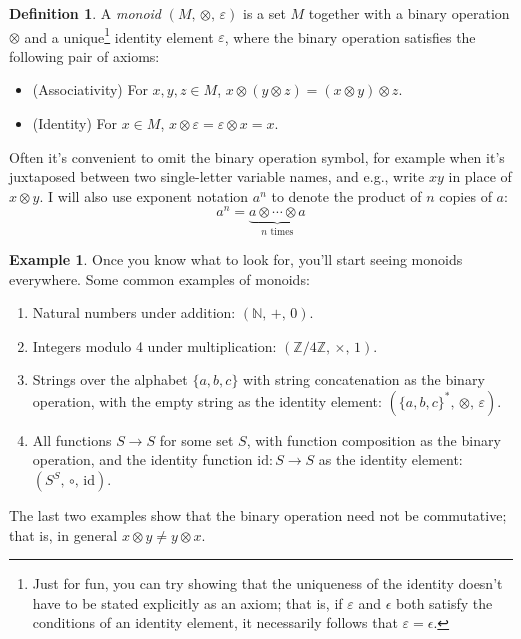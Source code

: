 \documentclass[headsepline,bibliography=totoc]{scrreport}
\theoremstyle{definition}
\newtheorem{example}{Example}[chapter]
\theoremstyle{definition}
\newtheorem{definition}{Definition}[chapter]
\theoremstyle{definition}
\begin{document}
\begin{definition} A \emph{monoid} $(M,\, \otimes,\, \varepsilon)$ is a set $M$ together with a binary operation $\otimes$ and a unique\footnote{Just for fun, you can try showing that the uniqueness of the identity doesn't have to be stated explicitly as an axiom; that is, if $\varepsilon$ and $\epsilon$ both satisfy the conditions of an identity element, it necessarily follows that $\varepsilon=\epsilon$.} identity element $\varepsilon$, where the binary operation satisfies the following pair of axioms:
\begin{itemize}
\item (Associativity) For $x, y, z \in M$, $x\otimes(y\otimes z)=(x\otimes y)\otimes z$.
\item (Identity) For $x\in M$, $x\otimes \varepsilon=\varepsilon\otimes x=x$.
\end{itemize}
\end{definition}


Often it's convenient to omit the binary operation symbol, for example when it's juxtaposed between two single-letter variable names, and e.g., write $xy$ in place of $x\otimes y$. I will also use exponent notation $a^n$ to denote the product of $n$ copies of $a$:
\[a^n=\underbrace{a\otimes\cdots\otimes a}_{\textrm{$n$ times}}\]

\begin{example}
Once you know what to look for, you'll start seeing monoids everywhere. Some common examples of monoids:

\begin{enumerate}
\item Natural numbers under addition: $(\mathbb{N},\, +,\, 0)$.
\item Integers modulo 4 under multiplication: $(\mathbb{Z}/4\mathbb{Z},\, \times,\, 1)$.
\item Strings over the alphabet $\{a,b,c\}$ with string concatenation as the binary operation, with the empty string as the identity element: $(\{a, b, c\}^*,\, \otimes,\, \varepsilon)$.
\item All functions $S\rightarrow S$ for some set $S$, with function composition as the binary operation, and the identity function $\mathrm{id}\colon S\rightarrow S$ as the identity element: $(S^S,\, \circ,\, \mathrm{id})$.
\end{enumerate}
\end{example}
The last two examples show that the binary operation need not be commutative; that is, in general $x\otimes y \neq y\otimes x$.
\end{document}
